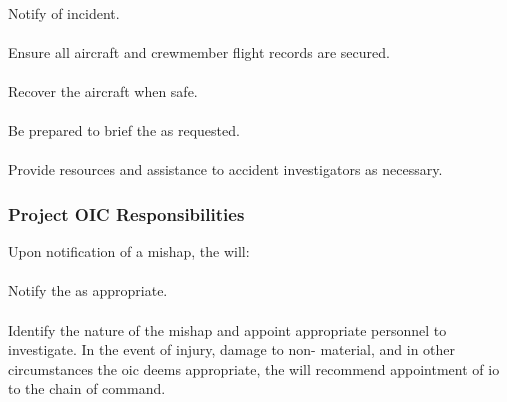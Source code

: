             \paragraph{}Notify  of incident. 
        
            \paragraph{}Ensure all aircraft and crewmember flight records are secured. 
        
            \paragraph{}Recover the aircraft when safe.
        
            \paragraph{}Be prepared to brief the  as requested.
        
            \paragraph{}Provide resources and assistance to accident investigators as necessary.
        
        \subsubsection{Project OIC Responsibilities} Upon notification of a mishap, the  will:
        
            \paragraph{}Notify the  as appropriate.
        
            \paragraph{}Identify the nature of the mishap and appoint appropriate personnel to investigate. In the event of injury, damage to non-\projectmars{} material, and in other circumstances the \ac{oic} deems appropriate, the  will recommend appointment of \ac{io} to the chain of command.